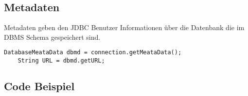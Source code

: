 \subsection{Metadaten}
Metadaten geben den JDBC Benutzer Informationen über die Datenbank die im DBMS Schema gespeichert sind.
\begin{lstlisting}[style=customJava]
    DatabaseMeataData dbmd = connection.getMeataData();
    String URL = dbmd.getURL;
\end{lstlisting}

\subsection{Code Beispiel}



